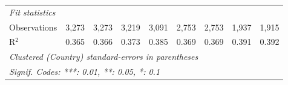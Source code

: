 \begin{tabular}{lcccccccc}
   \midrule \emph{Fit statistics}\\
   Observations                                                                       & 3,273       & 3,273       & 3,219       & 3,091       & 2,753   & 2,753   & 1,937         & 1,915\\  
   R$^2$                                                                              & 0.365       & 0.366       & 0.373       & 0.385       & 0.369   & 0.369   & 0.391         & 0.392\\  
   \midrule
   \multicolumn{9}{l}{\emph{Clustered (Country) standard-errors in parentheses}}\\
   \multicolumn{9}{l}{\emph{Signif. Codes: ***: 0.01, **: 0.05, *: 0.1}}\\
\end{tabular}
\par\endgroup


